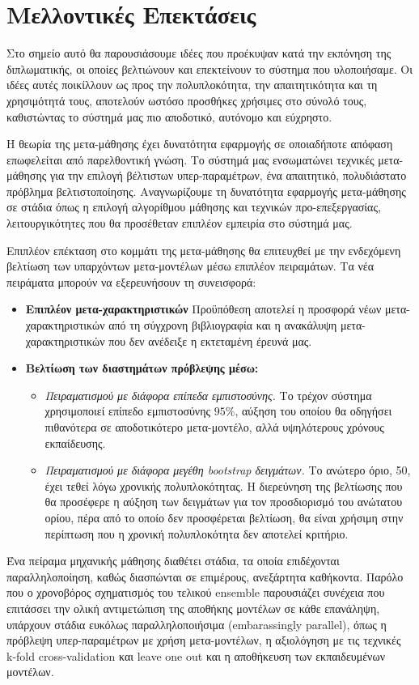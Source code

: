 \chapter{Μελλοντικές Επεκτάσεις}
Στο σημείο αυτό θα παρουσιάσουμε ιδέες που προέκυψαν κατά την εκπόνηση της διπλωματικής, οι οποίες βελτιώνουν και επεκτείνουν το σύστημα που υλοποιήσαμε. Οι ιδέες αυτές ποικίλλουν ως προς την πολυπλοκότητα, την απαιτητικότητα και τη χρησιμότητά τους, αποτελούν ωστόσο προσθήκες χρήσιμες στο σύνολό τους, καθιστώντας το σύστημά μας πιο αποδοτικό, αυτόνομο και εύχρηστο.

Η θεωρία της μετα-μάθησης έχει δυνατότητα εφαρμογής σε οποιαδήποτε απόφαση επωφελείται από παρελθοντική γνώση. Το σύστημά μας ενσωματώνει τεχνικές μετα-μάθησης για την επιλογή βέλτιστων υπερ-παραμέτρων, ένα απαιτητικό, πολυδιάστατο πρόβλημα βελτιστοποίησης. Αναγνωρίζουμε τη δυνατότητα εφαρμογής μετα-μάθησης σε στάδια όπως η επιλογή αλγορίθμου μάθησης και τεχνικών προ-επεξεργασίας, λειτουργικότητες που θα προσέθεταν επιπλέον εμπειρία στο σύστημά μας. 

Επιπλέον επέκταση στο κομμάτι της μετα-μάθησης θα επιτευχθεί με την ενδεχόμενη βελτίωση των υπαρχόντων μετα-μοντέλων μέσω επιπλέον πειραμάτων. Τα νέα πειράματα μπορούν να εξερευνήσουν τη συνεισφορά:
\begin{itemize}
	\item \textbf{Επιπλέον μετα-χαρακτηριστικών} Προϋπόθεση αποτελεί η προσφορά νέων μετα-χαρα\-κτηριστικών από τη σύγχρονη βιβλιογραφία και η ανακάλυψη μετα-χαρακτηριστικών που δεν ανέδειξε η εκτεταμένη έρευνά μας.
	\item \textbf{Βελτίωση των διαστημάτων πρόβλεψης μέσω:}
	\begin{itemize}
		\item \textit{Πειραματισμού με διάφορα επίπεδα εμπιστοσύνης.} Το τρέχον σύστημα χρησιμοποιεί επίπεδο εμπιστοσύνης $95\%$, αύξηση του οποίου θα οδηγήσει πιθανότερα σε αποδοτικότερο μετα-μοντέλο, αλλά υψηλότερους χρόνους εκπαίδευσης.
		\item \textit{Πειραματισμού με διάφορα μεγέθη bootstrap δειγμάτων.} Το ανώτερο όριο, 50, έχει τεθεί λόγω χρονικής πολυπλοκότητας. Η διερεύνηση της βελτίωσης που θα προσέφερε η αύξηση των δειγμάτων για τον προσδιορισμό του ανώτατου ορίου, πέρα από το οποίο δεν προσφέρεται βελτίωση, θα είναι χρήσιμη στην περίπτωση που η χρονική πολυπλοκότητα δεν αποτελεί κριτήριο.
	\end{itemize} 
\end{itemize}

Ένα πείραμα μηχανικής μάθησης διαθέτει στάδια, τα οποία επιδέχονται παραλληλοποίηση, καθώς διασπώνται σε επιμέρους, ανεξάρτητα καθήκοντα. Παρόλο που ο χρονοβόρος σχηματισμός του τελικού ensemble παρουσιάζει συνέχεια που επιτάσσει την ολική αντιμετώπιση της αποθήκης μοντέλων σε κάθε επανάληψη, υπάρχουν στάδια ευκόλως παραλληλοποιήσιμα (embarassingly parallel), όπως η πρόβλεψη υπερ-παραμέτρων με χρήση μετα-μοντέλων, η αξιολόγηση με τις τεχνικές k-fold cross-validation και leave one out και η αποθήκευση των εκπαιδευμένων μοντέλων.

